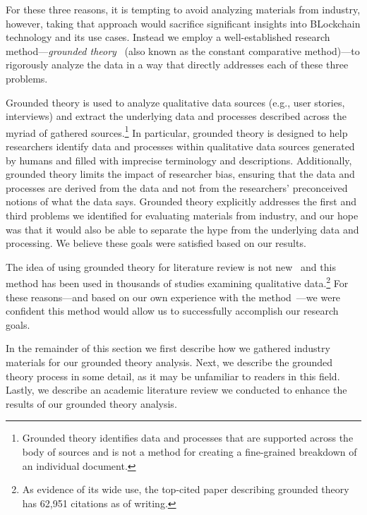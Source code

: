 For these three reasons, it is tempting to avoid analyzing materials from industry,
however, taking that approach would sacrifice significant insights into BLockchain technology and its use cases.
Instead we employ a well-established research method---\emph{grounded theory}~\cite{glaser1965constant,strauss1990basics,corbin1990grounded} (also known as the constant comparative method)---to rigorously analyze the data in a way that directly addresses each of these three problems.

Grounded theory is used to analyze qualitative data sources (e.g., user stories, interviews) and extract the underlying data and processes described across the myriad of gathered sources.\footnote{Grounded theory identifies data and processes that are supported across the body of sources and is not a method for creating a fine-grained breakdown of an individual document.}
In particular, grounded theory is designed to help researchers identify data and processes within qualitative data sources generated by humans and filled with imprecise terminology and descriptions.
Additionally, grounded theory limits the impact of researcher bias, ensuring that the data and processes are derived from the data and not from the researchers' preconceived notions of what the data says.
Grounded theory explicitly addresses the first and third problems we identified for evaluating materials from industry, and our hope was that it would also be able to separate the hype from the underlying data and processing. We believe these goals were satisfied based on our results. 

The idea of using grounded theory for literature review is not new~\cite{wolfswinkel2013using,yang2012descriptive} and this method has been used in thousands of studies examining qualitative data.\footnote{As evidence of its wide use, the top-cited paper describing grounded theory has 62,951 citations as of writing.}
For these reasons---and based on our own experience with the method~\cite{ruoti2017weighing}---we were confident this method would allow us to successfully accomplish our research goals.

In the remainder of this section we first describe how we gathered industry materials for our grounded theory analysis.
Next, we describe the grounded theory process in some detail, as it may be unfamiliar to readers in this field.
Lastly, we describe an academic literature review we conducted to enhance the results of our grounded theory analysis.

